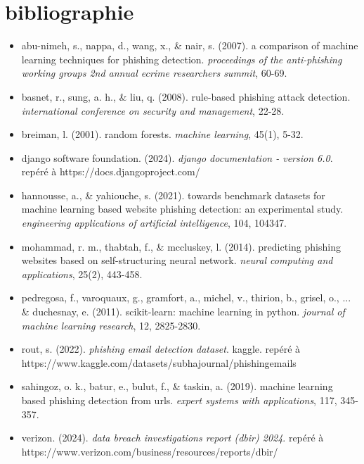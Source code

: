 \documentclass[12pt,a4paper]{report}
\begin{document}
\chapter*{bibliographie}

\begin{itemize}[leftmargin=0.5cm, itemindent=-0.5cm, label={}]
  
  \item abu-nimeh, s., nappa, d., wang, x., \& nair, s. (2007). a comparison of machine learning techniques for phishing detection. \textit{proceedings of the anti-phishing working groups 2nd annual ecrime researchers summit}, 60-69.
  
  \item basnet, r., sung, a. h., \& liu, q. (2008). rule-based phishing attack detection. \textit{international conference on security and management}, 22-28.
  
  \item breiman, l. (2001). random forests. \textit{machine learning}, 45(1), 5-32.
  
  \item django software foundation. (2024). \textit{django documentation - version 6.0}. repéré à https://docs.djangoproject.com/
  
  \item hannousse, a., \& yahiouche, s. (2021). towards benchmark datasets for machine learning based website phishing detection: an experimental study. \textit{engineering applications of artificial intelligence}, 104, 104347.
  
  \item mohammad, r. m., thabtah, f., \& mccluskey, l. (2014). predicting phishing websites based on self-structuring neural network. \textit{neural computing and applications}, 25(2), 443-458.
  
  \item pedregosa, f., varoquaux, g., gramfort, a., michel, v., thirion, b., grisel, o., ... \& duchesnay, e. (2011). scikit-learn: machine learning in python. \textit{journal of machine learning research}, 12, 2825-2830.
  
  \item rout, s. (2022). \textit{phishing email detection dataset}. kaggle. repéré à https://www.kaggle.com/datasets/subhajournal/phishingemails
  
  \item sahingoz, o. k., batur, e., bulut, f., \& taskin, a. (2019). machine learning based phishing detection from urls. \textit{expert systems with applications}, 117, 345-357.
  
  \item verizon. (2024). \textit{data breach investigations report (dbir) 2024}. repéré à https://www.verizon.com/business/resources/reports/dbir/
  
\end{itemize}
\end{document}
